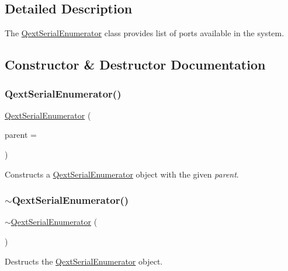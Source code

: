 \subsection{Detailed Description}
The \mbox{\hyperlink{class_qext_serial_enumerator}{Qext\+Serial\+Enumerator}} class provides list of ports available in the system. 



\subsection{Constructor \& Destructor Documentation}
\mbox{\label{class_qext_serial_enumerator_a85e0cdb6b81ac537d4ab7050498778fd}} 
\subsubsection{\texorpdfstring{QextSerialEnumerator()}{QextSerialEnumerator()}}
{\footnotesize\ttfamily \mbox{\hyperlink{class_qext_serial_enumerator}{Qext\+Serial\+Enumerator}} (\begin{DoxyParamCaption}\item[{Q\+Object $\ast$}]{parent = {} }\end{DoxyParamCaption})}

Constructs a \mbox{\hyperlink{class_qext_serial_enumerator}{Qext\+Serial\+Enumerator}} object with the given {\itshape parent}. \mbox{\label{class_qext_serial_enumerator_a150dc651f1a47a6fdb85933d115659d1}} 
\subsubsection{\texorpdfstring{$\sim$QextSerialEnumerator()}{~QextSerialEnumerator()}}
{\footnotesize\ttfamily $\sim$\mbox{\hyperlink{class_qext_serial_enumerator}{Qext\+Serial\+Enumerator}} (\begin{DoxyParamCaption}{ }\end{DoxyParamCaption})}

Destructs the \mbox{\hyperlink{class_qext_serial_enumerator}{Qext\+Serial\+Enumerator}} object. 

